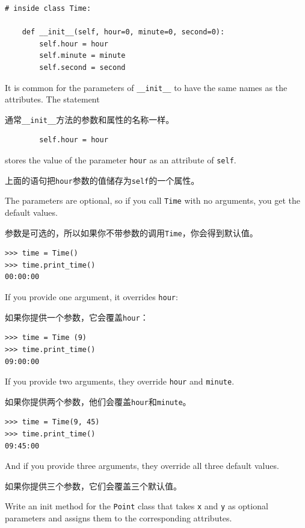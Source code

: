 \documentclass[10pt]{book}
\begin{document}
\begin{CJK}{UTF8}{gbsn}
\begin{verbatim}
# inside class Time:

    def __init__(self, hour=0, minute=0, second=0):
        self.hour = hour
        self.minute = minute
        self.second = second
\end{verbatim}
%
It is common for the parameters of \verb"__init__"
to have the same names as the attributes.  The statement

通常\verb"__init__"方法的参数和属性的名称一样。

\begin{verbatim}
        self.hour = hour
\end{verbatim}
%
stores the value of the parameter {\tt hour} as an attribute
of {\tt self}.

上面的语句把{\tt hour}参数的值储存为{\tt self}的一个属性。

The parameters are optional, so if you call {\tt Time} with
no arguments, you get the default values.

参数是可选的，所以如果你不带参数的调用{\tt Time}，你会得到默认值。

\begin{verbatim}
>>> time = Time()
>>> time.print_time()
00:00:00
\end{verbatim}
%
If you provide one argument, it overrides {\tt hour}:

如果你提供一个参数，它会覆盖{\tt hour}：

\begin{verbatim}
>>> time = Time (9)
>>> time.print_time()
09:00:00
\end{verbatim}
%
If you provide two arguments, they override {\tt hour} and
{\tt minute}.

如果你提供两个参数，他们会覆盖{\tt hour}和{\tt minute}。

\begin{verbatim}
>>> time = Time(9, 45)
>>> time.print_time()
09:45:00
\end{verbatim}
%
And if you provide three arguments, they override all three
default values.

如果你提供三个参数，它们会覆盖三个默认值。


\begin{exercise}

Write an init method for the {\tt Point} class that takes
{\tt x} and {\tt y} as optional parameters and assigns
them to the corresponding attributes.


\end{exercise}
\end{CJK}
\end{document}
